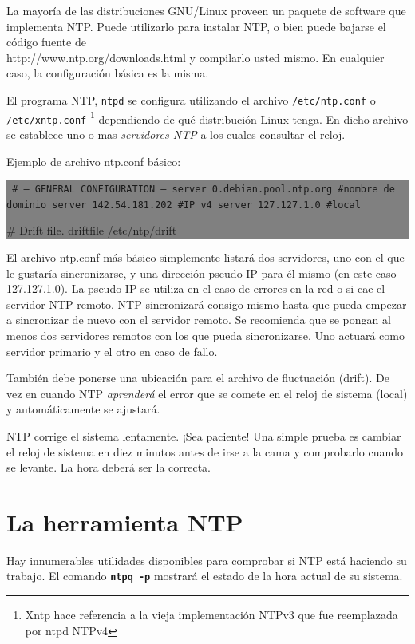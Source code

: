 \documentclass[12pt]{article}
\begin{document}
La mayoría de las distribuciones GNU/Linux proveen un paquete de software que implementa 
NTP. Puede utilizarlo para instalar NTP, o bien puede bajarse el código fuente de \\
http://www.ntp.org/downloads.html y compilarlo usted mismo. En
cualquier caso, la configuración básica es la misma.

El programa NTP, \texttt{ntpd} se configura utilizando el archivo \texttt{/etc/ntp.conf} o
\texttt{/etc/xntp.conf} \footnote{Xntp hace referencia a la vieja implementación 
NTPv3 que fue reemplazada por ntpd NTPv4} dependiendo de qué distribución Linux tenga. 
En dicho archivo se establece uno o mas \textit{servidores NTP} a los cuales 
consultar el reloj. 

Ejemplo de archivo ntp.conf básico: 

\colorbox{grey}{\parbox[t]{0.95\linewidth}{ \vspace*{0.5cm} {\tt
\# --- GENERAL CONFIGURATION ---
server  0.debian.pool.ntp.org #nombre de dominio 
server  142.54.181.202 #IP v4
server  127.127.1.0 #local 

\# Drift file.
driftfile /etc/ntp/drift
 } \vspace*{0.5cm} } } 

	
El archivo ntp.conf más básico simplemente listará dos servidores, uno
con el que le gustaría sincronizarse, y una dirección pseudo-IP para él 
mismo (en este caso 127.127.1.0). La pseudo-IP se utiliza en el caso de
errores en la red o si cae el servidor NTP remoto. NTP sincronizará
consigo mismo hasta que pueda empezar a sincronizar de nuevo con el 
servidor remoto. Se recomienda que se pongan al menos dos servidores remotos
con los que pueda sincronizarse. Uno actuará como servidor primario y el 
otro en caso de fallo.

También debe ponerse una ubicación para el archivo de fluctuación (drift). De 
vez en cuando NTP \textit{aprenderá} el error que se comete en el reloj de
sistema (local) y automáticamente se ajustará.

NTP corrige el sistema lentamente. ¡Sea paciente! Una simple prueba es
cambiar el reloj de sistema en diez minutos antes de irse a la cama y
comprobarlo cuando se levante. La hora deberá ser la correcta.

\section*{ La herramienta NTP}


Hay innumerables utilidades disponibles para comprobar si NTP está 
haciendo su trabajo. El comando \texttt{\textbf{ntpq -p}} mostrará el estado de la hora
actual de su sistema.
\end{document}
